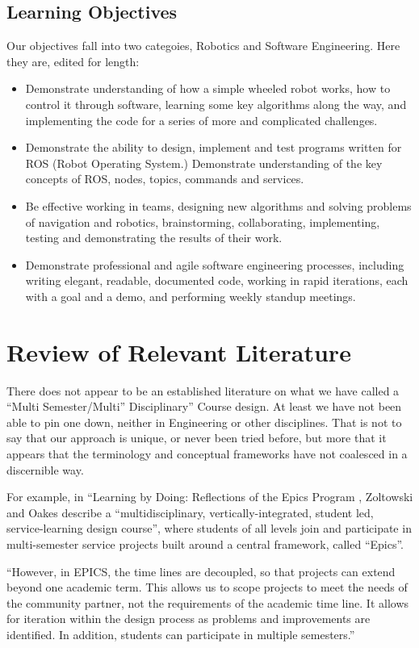\subsection{Learning Objectives} Our objectives fall into two categoies, Robotics and Software Engineering. Here they are, edited for length:

\begin{itemize}
\item Demonstrate understanding of how a simple wheeled robot works, how to control it through software, learning some key algorithms along the way, and implementing the code for a series of more and complicated challenges.
\item Demonstrate the ability to design, implement and test programs written for ROS (Robot Operating System.) Demonstrate understanding of the key concepts of ROS, nodes, topics, commands and services.
\item Be effective working in teams, designing new algorithms and solving problems of navigation and robotics, brainstorming, collaborating, implementing, testing and demonstrating the results of their work.
\item Demonstrate professional and agile software engineering processes, including writing elegant, readable, documented code, working in rapid iterations, each with a goal and a demo, and performing weekly standup meetings.
\end{itemize}

\section{Review of Relevant Literature}

There does not appear to be an established literature on what we have called a ``Multi Semester/Multi'' Disciplinary” Course design. At least we have not been able to pin one down, neither in Engineering or other disciplines. That is not to say that our approach is unique, or never been tried before, but more that it appears that the terminology and conceptual frameworks have not coalesced in a discernible way. 

For example, in “Learning by Doing: Reflections of the Epics Program \cite{Epics}, Zoltowski and Oakes describe a “multidisciplinary, vertically-integrated, student led, service-learning design course”, where students of all levels join and participate in multi-semester service projects built around a central framework, called “Epics”. 

“However, in EPICS, the time lines are decoupled, so that projects can extend beyond one academic term. This allows us to scope projects to meet the needs of the community partner, not the requirements of the academic time line. It allows for iteration within the design process as problems and improvements are identified. In addition, students can participate in multiple semesters.”

